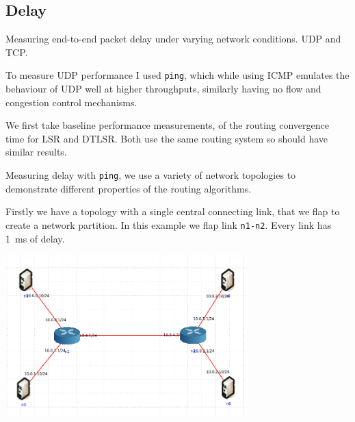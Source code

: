 \documentclass[10pt,twoside,a4paper]{article}
\begin{document}
\subsection{Delay}

Measuring end-to-end packet delay under varying network conditions. UDP and TCP.

To measure UDP performance I used \texttt{ping}, which while using ICMP emulates the behaviour of UDP well at higher throughputs, similarly having no flow and congestion control mechanisms.

We first take baseline performance measurements, of the routing convergence time for LSR and DTLSR. Both use the same routing system so should have similar results.

Measuring delay with \texttt{ping}, we use a variety of network topologies to demonstrate different properties of the routing algorithms.

Firstly we have a topology with a single central connecting link, that we flap to create a network partition. In this example we flap link \texttt{n1-n2}. Every link has \SI{1}{\ms} of delay.

\begin{minipage}{1\textwidth} \centering
	\includegraphics[width=0.7\textwidth]{delay_partition_topology}
\end{minipage}
\end{document}

